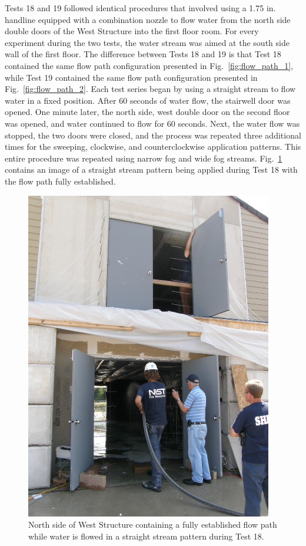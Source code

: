 \documentclass[12pt,oneside]{book}
\begin{document}
Tests 18 and 19 followed identical procedures that involved using a 1.75 in. handline equipped with a combination nozzle to flow water from the north side double doors of the West Structure into the first floor room. For every experiment during the two tests, the water stream was aimed at the south side wall of the first floor. The difference between Tests 18 and 19 is that Test 18 contained the same flow path configuration presented in Fig.~\ref{fig:flow_path_1}, while Test 19 contained the same flow path configuration presented in Fig.~\ref{fig:flow_path_2}. Each test series began by using a straight stream to flow water in a fixed position. After 60 seconds of water flow, the stairwell door was opened. One minute later, the north side, west double door on the second floor was opened, and water continued to flow for 60 seconds. Next, the water flow was stopped, the two doors were closed, and the process was repeated three additional times for the sweeping, clockwise, and counterclockwise application patterns. This entire procedure was repeated using narrow fog and wide fog streams. Fig.~\ref{fig:test_18_pic} contains an image of a straight stream pattern being applied during Test 18 with the flow path fully established.

\begin{figure}[!ht]
\includegraphics[width=4.25in]{../Pictures/Test_18}
\caption[North side of West Structure containing a fully established flow path during Test 18.]{North side of West Structure containing a fully established flow path while water is flowed in a straight stream pattern during Test 18.}
\label{fig:test_18_pic}
\end{figure}
\FloatBarrier
\end{document}
